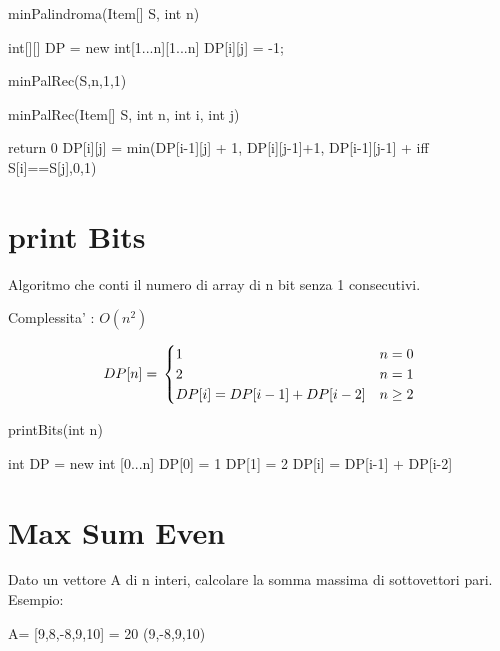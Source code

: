 \documentclass[oneside]{book}
\begin{document}
\begin{algorithm}
\caption{minPalindroma(Item[] S, int n)\label{alg:cap}}
\begin{algorithmic}
\State int[][] DP = new int[1...n][1...n]
		\State DP[i][j] = -1;
	\EndFor
\EndFor

\State minPalRec(S,n,1,1)
\end{algorithmic}
\end{algorithm}

\begin{algorithm}
\caption{minPalRec(Item[] S, int n, int i, int j)\label{alg:cap}}
\begin{algorithmic}
	return 0
\EndIf
{}
	\State DP[i][j] = min(DP[i-1][j] + 1, DP[i][j-1]+1, DP[i-1][j-1] + iff {S[i]==S[j],0,1})
\EndIf
\end{algorithmic}
\end{algorithm}
\section{print Bits}
Algoritmo che conti il numero di array di n bit senza 1 consecutivi.

Complessita' : $O(n^2)$

\begin{equation}
	DP[n] = \\
	\begin{cases}
	1 & n=0 \\
	2 & n=1 \\
	DP[i] = DP[i-1] + DP[i-2] & n \geq 2
	\end{cases}
\end{equation}

\begin{algorithm}
\caption{printBits(int n)\label{alg:cap}}
\begin{algorithmic}
	\State int DP = new int [0...n]
	\State DP[0] = 1
	\State DP[1] = 2
		\State DP[i] = DP[i-1] + DP[i-2]
	\EndFor
\end{algorithmic}
\end{algorithm}
\section{Max Sum Even}
Dato un vettore A di n interi, calcolare la somma massima di sottovettori pari. Esempio:

A= [9,8,-8,9,10]  = 20 (9,-8,9,10)
\end{document}

